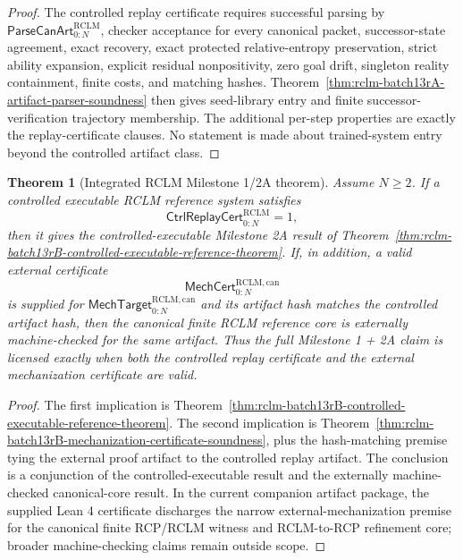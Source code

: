 \documentclass[11pt,a4paper]{article}
\newtheorem{theorem}{Theorem}[section]
\newcommand{\RCLM}{\mathrm{RCLM}}
\begin{document}
\begin{proof}
The controlled replay certificate requires successful parsing by \(\mathsf{ParseCanArt}_{0:N}^{\RCLM}\), checker acceptance for every canonical packet, successor-state agreement, exact recovery, exact protected relative-entropy preservation, strict ability expansion, explicit residual nonpositivity, zero goal drift, singleton reality containment, finite costs, and matching hashes.  Theorem~\ref{thm:rclm-batch13rA-artifact-parser-soundness} then gives seed-library entry and finite successor-verification trajectory membership.  The additional per-step properties are exactly the replay-certificate clauses.  No statement is made about trained-system entry beyond the controlled artifact class.
\end{proof}

\begin{theorem}[Integrated RCLM Milestone 1/2A theorem]
\label{thm:rclm-batch13rB-integrated-milestone-theorem}
Assume \(N\ge2\).  If a controlled executable RCLM reference system satisfies
\[
\mathsf{CtrlReplayCert}_{0:N}^{\RCLM}=1,
\]
then it gives the controlled-executable Milestone 2A result of Theorem~\ref{thm:rclm-batch13rB-controlled-executable-reference-theorem}.  If, in addition, a valid external certificate
\[
\mathsf{MechCert}_{0:N}^{\RCLM,\mathrm{can}}
\]
is supplied for \(\mathsf{MechTarget}_{0:N}^{\RCLM,\mathrm{can}}\) and its artifact hash matches the controlled artifact hash, then the canonical finite RCLM reference core is externally machine-checked for the same artifact.  Thus the full Milestone 1 + 2A claim is licensed exactly when both the controlled replay certificate and the external mechanization certificate are valid.
\end{theorem}

\begin{proof}
The first implication is Theorem~\ref{thm:rclm-batch13rB-controlled-executable-reference-theorem}.  The second implication is Theorem~\ref{thm:rclm-batch13rB-mechanization-certificate-soundness}, plus the hash-matching premise tying the external proof artifact to the controlled replay artifact.  The conclusion is a conjunction of the controlled-executable result and the externally machine-checked canonical-core result.  In the current companion artifact package, the supplied Lean 4 certificate discharges the narrow external-mechanization premise for the canonical finite RCP/RCLM witness and RCLM-to-RCP refinement core; broader machine-checking claims remain outside scope.
\end{proof}
\end{document}
